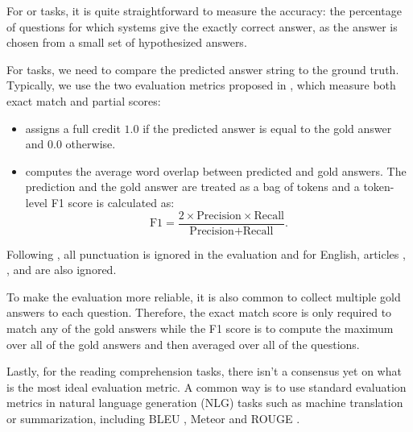 For  or  tasks, it is quite straightforward to measure the accuracy: the percentage of questions for which systems give the exactly correct answer, as the answer is chosen from a small set of hypothesized answers.

For  tasks, we need to compare the predicted answer string to the ground truth. Typically, we use the two evaluation metrics proposed in , which measure both exact match and partial scores:

\begin{itemize}
    \item
         assigns a full credit $1.0$ if the predicted answer is equal to the gold answer and $0.0$ otherwise.
    \item
         computes the average word overlap between predicted and gold answers. The prediction and the gold answer are treated as a bag of tokens and a token-level F1 score is calculated as: $$ \text{F1} = \frac{2 \times \text{Precision} \times \text{Recall}}{\text{Precision} + \text{Recall}}. $$
\end{itemize}


Following , all punctuation is ignored in the evaluation and for English, articles  , , and  are also ignored.

To make the evaluation more reliable, it is also common to collect multiple gold answers to each question. Therefore, the exact match score is only required to match any of the gold answers while the F1 score is to compute the maximum over all of the gold answers and then averaged over all of the questions.

Lastly, for the  reading comprehension tasks, there isn't a consensus yet on what is the most ideal evaluation metric. A common way is to use standard evaluation metrics in natural language generation (NLG) tasks such as machine translation or summarization, including BLEU \cite{papineni2002bleu}, Meteor \cite{banerjee2005meteor} and ROUGE \cite{lin2004rouge}.
